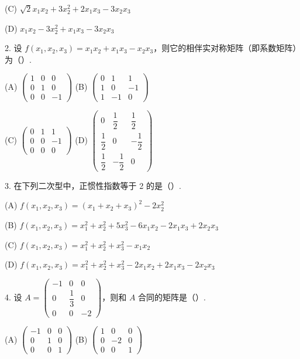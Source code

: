 \documentclass[UTF8, 12pt, fontset=fandol, oneside]{ctexart}
\begin{document}
(C) $\sqrt2x_1x_2+3x_2^2+2x_1x_3-3x_2x_3$

(D) $x_1x_2-3x_2^2+x_1x_3-3x_2x_3$

2. 设 $f(x_1,x_2,x_3)=x_1x_2+x_1x_3-x_2x_3$，则它的相伴实对称矩阵（即系数矩阵）为（\quad ）.

(A) $\left(\begin{array}{ccc}1&0&0\\ 0&1&0\\ 0&0&-1\end{array}\right)$
\qquad
(B) $\left(\begin{array}{ccc}0&1&1\\ 1&0&-1\\ 1&-1&0\end{array}\right)$

(C) $\left(\begin{array}{ccc}0&1&1\\ 0&0&-1\\ 0&0&0\end{array}\right)$
\qquad
(D) $\left(\begin{array}{ccc}0&\dfrac12&\dfrac12\\ \dfrac12&0&-\dfrac12\\ \dfrac12&-\dfrac12&0\end{array}\right)$

3. 在下列二次型中，正惯性指数等于 2 的是（\quad ）.

(A) $f(x_1,x_2,x_3)=(x_1+x_2+x_3)^2-2x_2^2$

(B) $f(x_1,x_2,x_3)=x_1^2+x_2^2+5x_3^2-6x_1x_2-2x_1x_3+2x_2x_3$

(C) $f(x_1,x_2,x_3)=x_1^2+x_2^2+x_3^2-x_1x_2$

(D) $f(x_1,x_2,x_3)=x_1^2+x_2^2+x_3^2-2x_1x_2+2x_1x_3-2x_2x_3$

4. 设 $A=\left(\begin{array}{ccc}-1&0&0\\ 0&\dfrac13&0\\ 0&0&-2\end{array}\right)$，则和 $A$ 合同的矩阵是（\quad ）.

(A) $\left(\begin{array}{ccc}-1&0&0\\ 0&1&0\\ 0&0&1\end{array}\right)$
\qquad
(B) $\left(\begin{array}{ccc}1&0&0\\ 0&-2&0\\ 0&0&1\end{array}\right)$
\end{document}
